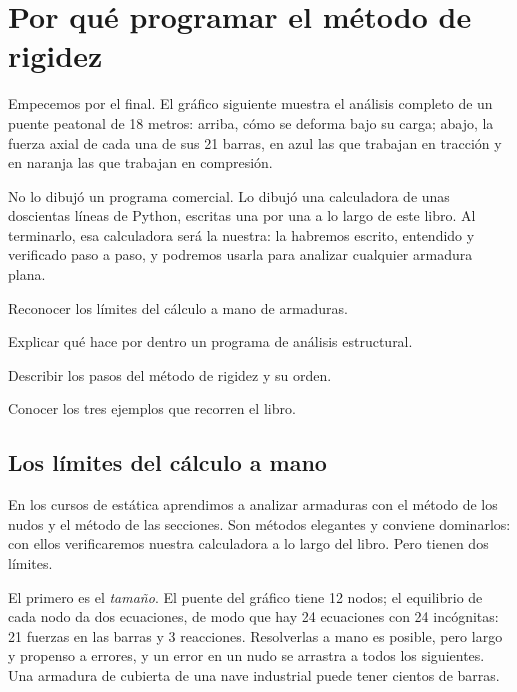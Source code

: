 \chapter{Por qué programar el método de rigidez}\label{cap:por_que_programar}

Empecemos por el final. El gráfico siguiente muestra el análisis completo de
un puente peatonal de 18 metros: arriba, cómo se deforma bajo su carga;
abajo, la fuerza axial de cada una de sus 21 barras, en azul las que trabajan
en tracción y en naranja las que trabajan en compresión.


No lo dibujó un programa comercial. Lo dibujó una calculadora de unas
doscientas líneas de Python, escritas una por una a lo largo de este libro.
Al terminarlo, esa calculadora será la nuestra: la habremos escrito, entendido
y verificado paso a paso, y podremos usarla para analizar cualquier armadura
plana.

\begin{objetivos}
  \item Reconocer los límites del cálculo a mano de armaduras.
  \item Explicar qué hace por dentro un programa de análisis estructural.
  \item Describir los pasos del método de rigidez y su orden.
  \item Conocer los tres ejemplos que recorren el libro.
\end{objetivos}

\section{Los límites del cálculo a mano}\label{sec:limites}

En los cursos de estática aprendimos a analizar armaduras con el método de
los nudos y el método de las secciones. Son métodos elegantes y conviene
dominarlos: con ellos verificaremos nuestra calculadora a lo largo del libro.
Pero tienen dos límites.

El primero es el \emph{tamaño}. El puente del gráfico tiene 12 nodos; el
equilibrio de cada nodo da dos ecuaciones, de modo que hay 24 ecuaciones con
24 incógnitas: 21 fuerzas en las barras y 3 reacciones. Resolverlas a mano es
posible, pero largo y propenso a errores, y un error en un nudo se arrastra a
todos los siguientes. Una armadura de cubierta de una nave industrial puede
tener cientos de barras.

